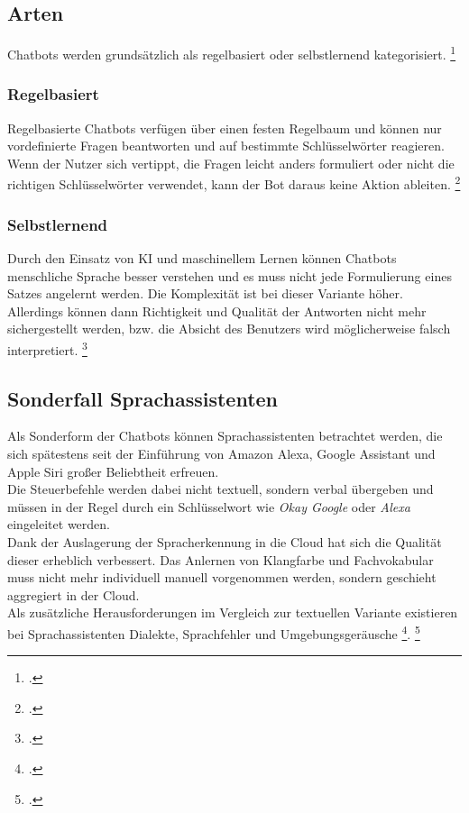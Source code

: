 \subsection{Arten}
Chatbots werden grundsätzlich als regelbasiert oder selbstlernend kategorisiert.
\footcite[Vgl.][51\psq]{Groetz_2018_Sprich_mit_mir}
\subsubsection{Regelbasiert}
Regelbasierte Chatbots verfügen über einen festen Regelbaum und können nur vordefinierte Fragen beantworten und auf bestimmte Schlüsselwörter reagieren.\\
Wenn der Nutzer sich vertippt, die Fragen leicht anders formuliert oder nicht die richtigen Schlüsselwörter verwendet, kann der Bot daraus keine Aktion ableiten.
\footcite[Vgl.][51\psq]{Groetz_2018_Sprich_mit_mir}
\subsubsection{Selbstlernend}
Durch den Einsatz von \acs{KI} und maschinellem Lernen können Chatbots menschliche Sprache besser verstehen und es muss nicht jede Formulierung eines Satzes angelernt werden. Die Komplexität ist bei dieser Variante höher.
Allerdings können dann Richtigkeit und Qualität der Antworten nicht mehr sichergestellt werden, bzw. die Absicht des Benutzers wird möglicherweise falsch interpretiert.
\footcites[Vgl.][151\psq]{Feindt_2006_Gespraechskompetenz}[Vgl.][51\psq]{Groetz_2018_Sprich_mit_mir}

\subsection{Sonderfall Sprachassistenten}
Als Sonderform der Chatbots können Sprachassistenten betrachtet werden, die sich spätestens seit der Einführung von Amazon Alexa, Google Assistant und Apple Siri großer Beliebtheit erfreuen.
\\
Die Steuerbefehle werden dabei nicht textuell, sondern verbal übergeben und müssen in der Regel durch ein Schlüsselwort wie \textit{Okay Google} oder \textit{Alexa} eingeleitet werden.\\
Dank der Auslagerung der Spracherkennung in die Cloud hat sich die Qualität dieser erheblich verbessert. Das Anlernen von Klangfarbe und Fachvokabular muss nicht mehr individuell manuell vorgenommen werden, sondern geschieht aggregiert in der Cloud.\\
Als zusätzliche Herausforderungen im Vergleich zur textuellen Variante existieren bei Sprachassistenten \glqq{}Dialekte, Sprachfehler und Umgebungsgeräusche\grqq
\footcite[][64]{Puscher_2018_Gut_zugehoert}{}.
\footcites[Vgl.][64]{Puscher_2018_Gut_zugehoert}[Vgl.][50]{Groetz_2018_Sprich_mit_mir}

